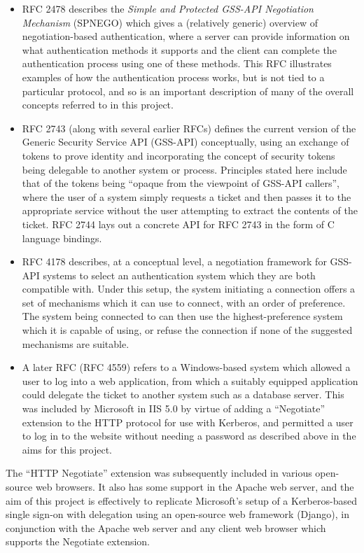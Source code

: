 \documentclass[12pt]{report}
\begin{document}
\begin{itemize}
\item
  RFC 2478\cite{RFC2478} describes the \textit{Simple and Protected GSS-API Negotiation Mechanism} (SPNEGO) which gives a (relatively generic) overview of negotiation-based authentication, where a server can provide information on what authentication methods it supports and the client can complete the authentication process using one of these methods. This RFC illustrates examples of how the authentication process works, but is not tied to a particular protocol, and so is an important description of many of the overall concepts referred to in this project.
\item
  RFC 2743\cite{RFC2743} (along with several earlier RFCs) defines the current version of the Generic Security Service API (GSS-API) conceptually, using an exchange of tokens to prove identity and incorporating the concept of security tokens being delegable to another system or process. Principles stated here include that of the tokens being ``opaque from the viewpoint of GSS-API callers'', where the user of a system simply requests a ticket and then passes it to the appropriate service without the user attempting to extract the contents of the ticket. RFC 2744\cite{RFC2744} lays out a concrete API for RFC 2743 in the form of C language bindings.
\item
  RFC 4178\cite{RFC4178} describes, at a conceptual level, a negotiation framework for GSS-API systems to select an authentication system which they are both compatible with. Under this setup, the system initiating a connection offers a set of mechanisms which it can use to connect, with an order of preference. The system being connected to can then use the highest-preference system which it is capable of using, or refuse the connection if none of the suggested mechanisms are suitable.
\item
  A later RFC (RFC 4559\cite{RFC4559}) refers to a Windows-based system which allowed a user to log into a web application, from which a suitably equipped application could delegate the ticket to another system such as a database server. This was included by Microsoft in IIS 5.0 by virtue of adding a ``Negotiate'' extension to the HTTP protocol for use with Kerberos, and permitted a user to log in to the website without needing a password as described above in the aims for this project.
\end{itemize}

The ``HTTP Negotiate'' extension was subsequently included in various open-source web browsers. It also has some support in the Apache web server, and the aim of this project is effectively to replicate Microsoft's setup of a Kerberos-based single sign-on with delegation using an open-source web framework (Django), in conjunction with the Apache web server and any client web browser which supports the Negotiate extension.
\end{document}
